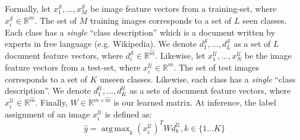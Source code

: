 \documentclass[11pt,a4paper]{article}
\DeclareMathOperator*{\argmax}{arg\,max}
\newcommand\gal[1]{\textcolor{bright}{\textbf{GAL:} #1 }}
\newcommand\yuval[1]{\textcolor{darkpink}{\textbf{YUVAL:} #1 }}
\begin{document}
Formally, let $x^{\mathcal{S}}_1,\ldots,x^{\mathcal{S}}_{M}$ be image feature vectors from a training-set, where $x^{\mathcal{S}}_i\in \mathbb{R}^{m}$. The set of $M$ training images corresponds to a set of $L$ seen classes. Each class has a \textit{single} \enquote{class description} which is a document written by experts in free language (e.g. Wikipedia). We denote $d^{\mathcal{S}}_1,\ldots,d^{\mathcal{S}}_{L}$ as a set of $L$ document feature vectors, 
where $d^{\mathcal{S}}_i\in \mathbb{R}^{\hat{m}}$.
Likewise, let $x^{\mathcal{U}}_1,\ldots,x^{\mathcal{U}}_{N}$ be the image feature vectors from a test-set, where $x^{\mathcal{U}}_i\in \mathbb{R}^{m}$. The set of test images corresponds to a set of $K$ unseen classes. Likewise, each class has a \textit{single} \enquote{class description}. We denote $d^{\mathcal{U}}_1,\ldots,d^{\mathcal{U}}_{K}$ as a sets of document feature vectors, 
where $x^{\mathcal{U}}_i\in \mathbb{R}^{\hat{m}}$.
Finally, \(W\in \mathbb{R}^{m\times\hat{m}}\) is our learned matrix.
At inference, the label assignment of
an image $x_i^{\mathcal{U}}$ is defined as:
\begin{equation}
  \label{equation:attention}
  {\hat{y}}=\argmax_{k} \left( x_i^{\mathcal{U}} \right) ^{T}Wd^{\mathcal{U}}_{k}, k \in \{1 \dots K\}
\end{equation}




\end{document}
